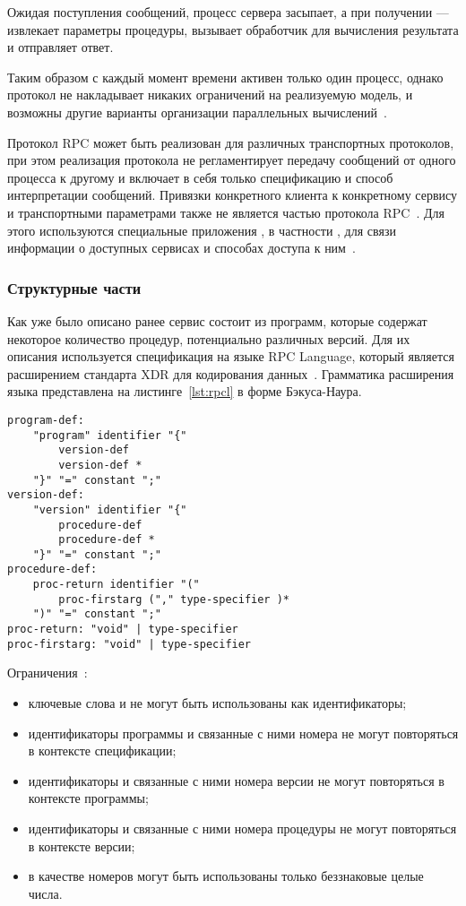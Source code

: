 Ожидая поступления сообщений, процесс сервера засыпает, а при получении ---
извлекает параметры процедуры, вызывает обработчик для вычисления результата и
отправляет ответ.

Таким образом с каждый момент времени активен только один процесс, однако
протокол не накладывает никаких ограничений на реализуемую модель, и возможны
другие варианты организации параллельных вычислений~\cite{rfc5531}.

Протокол RPC может быть реализован для различных транспортных протоколов, при
этом реализация протокола не регламентирует передачу сообщений от одного
процесса к другому и включает в себя только спецификацию и способ интерпретации
сообщений. Привязки конкретного клиента к конкретному сервису и транспортными
параметрами также не является частью протокола RPC~\cite{rfc5531}. Для этого
используются специальные приложения , в частности
, для связи информации о доступных сервисах и способах доступа к
ним~\cite{rfc1833}.

\subsubsection{Структурные части}

Как уже было описано ранее сервис состоит из программ, которые содержат
некоторое количество процедур, потенциально различных версий. Для их описания
используется спецификация на языке RPC Language, который является расширением
стандарта XDR для кодирования данных~\mbox{\cite{rfc5531}\cite{rfc4506}}.
Грамматика расширения языка представлена на листинге~\ref{lst:rpcl} в
форме Бэкуса-Наура.

\begin{lstlisting}[caption={Структура RPCL}, label={lst:rpcl}]
program-def:
    "program" identifier "{"
        version-def
        version-def *
    "}" "=" constant ";"
version-def:
    "version" identifier "{"
        procedure-def
        procedure-def *
    "}" "=" constant ";"
procedure-def:
    proc-return identifier "("
        proc-firstarg ("," type-specifier )*
    ")" "=" constant ";"
proc-return: "void" | type-specifier
proc-firstarg: "void" | type-specifier
\end{lstlisting}

Ограничения~\cite{rfc5531}:
\begin{itemize}
    \item ключевые слова  и  не могут быть
          использованы как идентификаторы;
    \item идентификаторы программы и связанные с ними номера не могут
          повторяться в контексте спецификации;
    \item идентификаторы и связанные с ними номера версии не могут
          повторяться в контексте программы;
    \item идентификаторы и связанные с ними номера процедуры не могут
          повторяться в контексте версии;
    \item в качестве номеров могут быть использованы только беззнаковые
          целые числа.
\end{itemize}

